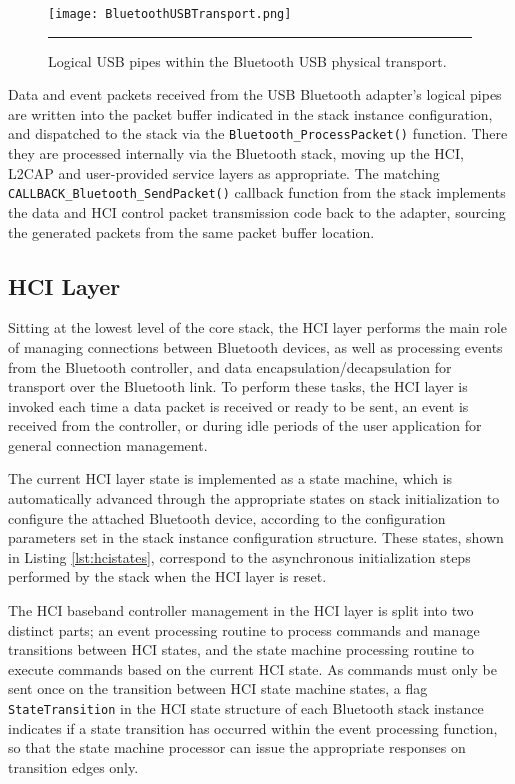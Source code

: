 \begin{figure}[tbph]
	\vspace{1em}
	\centering
		\texttt{[image: BluetoothUSBTransport.png]}
	\rule{35em}{0.5pt}
	\caption[Logical USB pipes within the Bluetooth USB transport]{Logical USB pipes within the Bluetooth USB physical transport.}
	\label{fig:btusbtransport}
\end{figure}

Data and event packets received from the USB Bluetooth adapter's logical pipes are written into the packet buffer indicated in the stack instance configuration, and dispatched to the stack via the \lstinline{Bluetooth_ProcessPacket()} function. There they are processed internally via the Bluetooth stack, moving up the HCI, L2CAP and user-provided service layers as appropriate. The matching \lstinline{CALLBACK_Bluetooth_SendPacket()} callback function from the stack implements the data and HCI control packet transmission code back to the adapter, sourcing the generated packets from the same packet buffer location.

\subsection{HCI Layer}

Sitting at the lowest level of the core stack, the HCI layer performs the main role of managing connections between Bluetooth devices, as well as processing events from the Bluetooth controller, and data encapsulation/decapsulation for transport over the Bluetooth link. To perform these tasks, the HCI layer is invoked each time a data packet is received or ready to be sent, an event is received from the controller, or during idle periods of the user application for general connection management.

The current HCI layer state is implemented as a state machine, which is automatically advanced through the appropriate states on stack initialization to configure the attached Bluetooth device, according to the configuration parameters set in the stack instance configuration structure. These states, shown in Listing \ref{lst:hcistates}, correspond to the asynchronous initialization steps performed by the stack when the HCI layer is reset.



The HCI baseband controller management in the HCI layer is split into two distinct parts; an event processing routine to process commands and manage transitions between HCI states, and the state machine processing routine to execute commands based on the current HCI state. As commands must only be sent once on the transition between HCI state machine states, a flag \lstinline{StateTransition} in the HCI state structure of each Bluetooth stack instance indicates if a state transition has occurred within the event processing function, so that the state machine processor can issue the appropriate responses on transition edges only.

